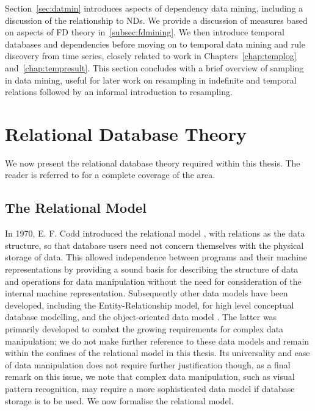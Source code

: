 Section~\ref{sec:datmin} introduces aspects of dependency data mining,
including a discussion of the relationship to NDs. We provide a discussion of measures based
on aspects of FD theory in~\ref{subsec:fdmining}. We then introduce
temporal databases and dependencies before moving on to temporal data
mining and rule discovery from time series, closely
related to work in Chapters~\ref{chap:templog} and~\ref{chap:tempresult}.
This section concludes with a brief overview of sampling in data mining,
useful for later work on resampling in indefinite and temporal
relations followed by an informal introduction to resampling.


\section{Relational Database Theory}\label{sec:relmod}

We now present the relational database theory required within this
thesis. The reader is referred to
\cite{atze93,databasefound,Maier83,Ullm88} for a complete coverage of
the area.

\subsection{The Relational Model}

In 1970, E. F. Codd introduced the relational model \cite{cod70}, with
relations as the data structure,  so
that database users need not concern themselves with the physical
storage of data.  This allowed independence between programs and their
machine representations by providing a sound basis for describing the
structure of data and operations for data manipulation without the
need for consideration of the internal machine
representation. Subsequently other data models have been developed,
including the Entity-Relationship model, for high level conceptual
database modelling, and the object-oriented data model
\cite{kim90,databasefound}. The latter was primarily developed to
combat the growing requirements for complex data manipulation; we do
not make further reference to these data models and remain within the
confines of the relational model in this thesis. Its universality and ease of data
manipulation does not require further justification though, as a final
remark on this issue, we note that complex data manipulation, such as
visual pattern recognition, may require a more sophisticated data
model if database storage is to be used. We now formalise the
relational model.


